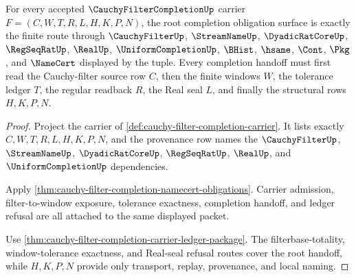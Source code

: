 \begin{theorem}
\label{thm:cauchy-filter-completion-root-obligation-surface}
For every accepted $\CauchyFilterCompletionUp$ carrier $F=(C,W,T,R,L,H,K,P,N)$, the root completion obligation surface is exactly the finite route through $\CauchyFilterUp$, $\StreamNameUp$, $\DyadicRatCoreUp$, $\RegSeqRatUp$, $\RealUp$, $\UniformCompletionUp$, $\BHist$, $\hsame$, $\Cont$, $\Pkg$, and $\NameCert$ displayed by the tuple. Every completion handoff must first read the Cauchy-filter source row $C$, then the finite windows $W$, the tolerance ledger $T$, the regular readback $R$, the Real seal $L$, and finally the structural rows $H,K,P,N$.
\end{theorem}
\begin{proof}
Project the carrier of \autoref{def:cauchy-filter-completion-carrier}. It lists exactly $C,W,T,R,L,H,K,P,N$, and the provenance row names the $\CauchyFilterUp$, $\StreamNameUp$, $\DyadicRatCoreUp$, $\RegSeqRatUp$, $\RealUp$, and $\UniformCompletionUp$ dependencies.

Apply \autoref{thm:cauchy-filter-completion-namecert-obligations}. Carrier admission, filter-to-window exposure, tolerance exactness, completion handoff, and ledger refusal are all attached to the same displayed packet.

Use \autoref{thm:cauchy-filter-completion-carrier-ledger-package}. The filterbase-totality, window-tolerance exactness, and Real-seal refusal routes cover the root handoff, while $H,K,P,N$ provide only transport, replay, provenance, and local naming.
\end{proof}

